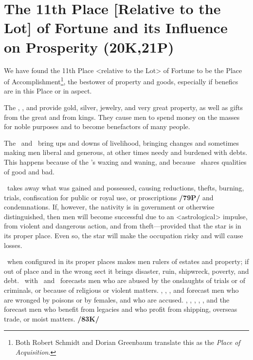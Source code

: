 \section{The 11th Place [Relative to the Lot] of Fortune and its Influence on Prosperity (20K,21P)}
We have found the 11th Place <relative to the Lot> of Fortune to be the Place of Accomplishment\footnote{Both Robert Schmidt and Dorian Greenbaum translate this as the \textsl{Place of Acquisition}.}, the bestower of property and goods, especially if benefics are in this Place or in aspect. 

  
The \Sun, \Jupiter, and \Venus provide gold, silver, jewelry, and very great property, as well as gifts from the great and from kings. They cause men to spend money on the masses for noble purposes and to become benefactors of many people. 

 
The \Moon\, and \Mercury\, bring ups and downs of livelihood, bringing changes and sometimes making men liberal and generous, at other times needy and burdened with debts. This happens because of the \Moon’s waxing and waning, and because \Mercury\, shares qualities of good and bad. 

\Mars\, takes away what was gained and possessed, causing reductions, thefts, burning, trials, confiscation for public or royal use, or proscriptions \textbf{/79P/} and condemnations. If, however, the nativity is in government or otherwise distinguished, then men will become successful due to an <astrological> impulse, from violent and dangerous action, and from theft—provided that the star is in its proper place. Even so, the star will make the occupation risky and will cause losses. 

\Saturn\, when configured in its proper places makes men rulers of estates and property; if out of place and in the wrong sect it brings disaster, ruin, shipwreck, poverty, and debt. \Saturn\, with \Mercury\, and \Mars\, forecasts men who are abused by the onslaughts of trials or of criminals, or because of religious or violent matters. \Saturn, \Mercury, \Mars, and \Venus forecast men who are wronged by poisons or by females, and who are accused. \Saturn, \Mars, \Mercury, \Venus, \Jupiter, and the \Moon\, forecast men who benefit from legacies and who profit from shipping, overseas trade, or moist matters. \textbf{/83K/}

